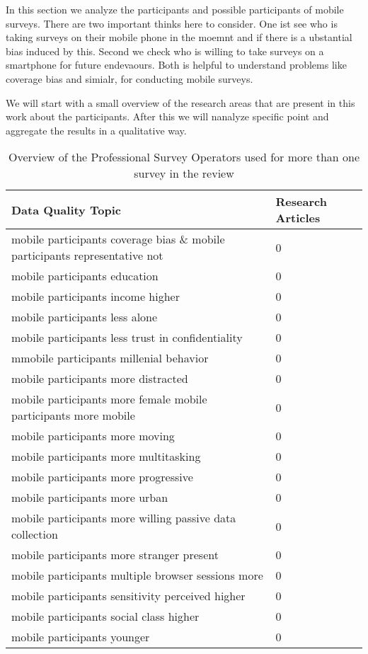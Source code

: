 In this section we analyze the participants and possible participants of mobile surveys. There are two important thinks here to consider. One ist see who is taking surveys on their mobile phone in the moemnt and if there is a ubstantial bias induced by this. Second we check who is willing to take surveys on a smartphone for future endevaours. Both is helpful to understand problems like coverage bias and simialr, for conducting mobile surveys.

We will start with a small overview of the research areas that are present in this work about the participants. After this we will nanalyze specific point and aggregate the results in a qualitative way.



\begin{table}
	\centering
	\begin{tabular}{ll}
		\toprule
		Data Quality Topic  &  Research Articles \\
		\midrule
        mobile participants coverage bias \& mobile participants representative not    & 0  \\
        mobile participants education    & 0  \\
        mobile participants income higher   & 0  \\
        mobile participants less alone    & 0  \\
        mobile participants less trust in confidentiality    & 0  \\
        mmobile participants millenial behavior    & 0  \\
        mobile participants more distracted    & 0  \\
        mobile participants more female
        mobile participants more mobile    & 0  \\
        mobile participants more moving    & 0  \\
        mobile participants more multitasking    & 0  \\
        mobile participants more progressive    & 0  \\
        mobile participants more urban    & 0  \\
        mobile participants more willing passive data collection    & 0  \\
        mobile participants more stranger present    & 0  \\
        mobile participants multiple browser sessions more    & 0  \\
        mobile participants sensitivity perceived higher    & 0  \\
        mobile participants social class higher    & 0  \\
        mobile participants younger    & 0  \\
		\bottomrule 
	\end{tabular}
	\caption{Overview of the Professional Survey Operators used for more than one survey in the review}
	\label{tab: author}
\end{table}


